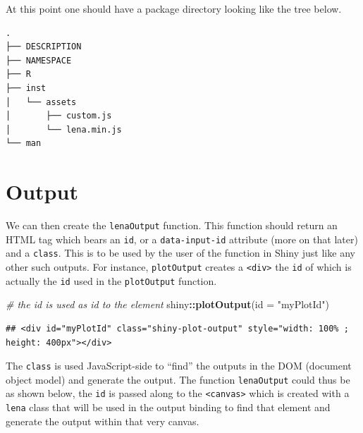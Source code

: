 \documentclass[
]{krantz}
\makeatletter
\newenvironment{Shaded}{\begin{snugshade}}{\end{snugshade}}
\newcommand{\CommentTok}[1]{\textcolor[rgb]{0.37,0.37,0.37}{\textit{#1}}}
\newcommand{\ControlFlowTok}[1]{\textcolor[rgb]{0.27,0.27,0.27}{\textbf{#1}}}
\newcommand{\DataTypeTok}[1]{\textcolor[rgb]{0.27,0.27,0.27}{#1}}
\newcommand{\KeywordTok}[1]{\textcolor[rgb]{0.27,0.27,0.27}{\textbf{#1}}}
\newcommand{\NormalTok}[1]{#1}
\newcommand{\OperatorTok}[1]{\textcolor[rgb]{0.43,0.43,0.43}{\textbf{#1}}}
\newcommand{\StringTok}[1]{\textcolor[rgb]{0.5,0.5,0.5}{#1}}
\newenvironment{kframe}{%
\medskip{}
\setlength{\fboxsep}{.8em}
 \def\at@end@of@kframe{}%
 \ifinner\ifhmode%
  \def\at@end@of@kframe{\end{minipage}}%
  \begin{minipage}{\columnwidth}%
 \fi\fi%
 \def\FrameCommand##1{\hskip\@totalleftmargin \hskip-\fboxsep
 \colorbox{shadecolor}{##1}\hskip-\fboxsep
     \hskip-\linewidth \hskip-\@totalleftmargin \hskip\columnwidth}%
 \MakeFramed {\advance\hsize-\width
   \@totalleftmargin\z@ \linewidth\hsize
   \@setminipage}}%
 {\par\unskip\endMakeFramed%
 \at@end@of@kframe}
\renewenvironment{Shaded}{\begin{kframe}}{\end{kframe}}
\makeatother
\begin{document}
At this point one should have a package directory looking like the tree below.

\begin{verbatim}
.
├── DESCRIPTION
├── NAMESPACE
├── R
├── inst
│   └── assets
│       ├── custom.js
│       └── lena.min.js
└── man
\end{verbatim}

\hypertarget{output}{%
\section{Output}\label{output}}

We can then create the \texttt{lenaOutput} function. This function should return an HTML tag which bears an \texttt{id}, or a \texttt{data-input-id} attribute (more on that later) and a \texttt{class}. This is to be used by the user of the function in Shiny just like any other such outputs. For instance, \texttt{plotOutput} creates a \texttt{\textless{}div\textgreater{}} the \texttt{id} of which is actually the \texttt{id} used in the \texttt{plotOutput} function.

\begin{Shaded}
\begin{Highlighting}[]
\CommentTok{\# the id is used as id to the element}
\NormalTok{shiny}\OperatorTok{::}\KeywordTok{plotOutput}\NormalTok{(}\DataTypeTok{id =} \StringTok{"myPlotId"}\NormalTok{)}
\end{Highlighting}
\end{Shaded}

\begin{verbatim}
## <div id="myPlotId" class="shiny-plot-output" style="width: 100% ; height: 400px"></div>
\end{verbatim}

The \texttt{class} is used JavaScript-side to ``find'' the outputs in the DOM (document object model) and generate the output. The function \texttt{lenaOutput} could thus be as shown below, the \texttt{id} is passed along to the \texttt{\textless{}canvas\textgreater{}} which is created with a \texttt{lena} class that will be used in the output binding to find that element and generate the output within that very canvas.

\begin{Shaded}
\end{Shaded}
\end{document}
